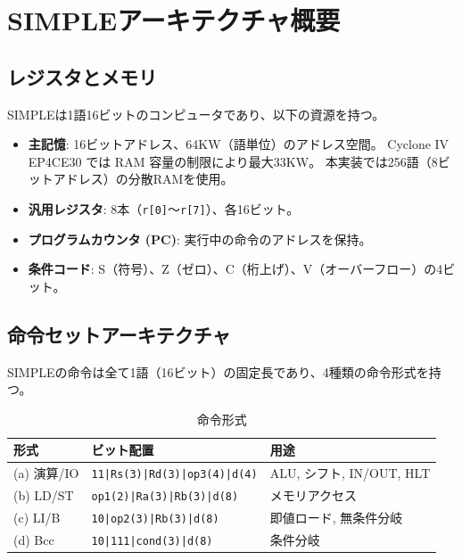 \documentclass[a4paper,11pt]{ltjsarticle}
\begin{document}
\section{SIMPLEアーキテクチャ概要}

\subsection{レジスタとメモリ}

SIMPLEは1語16ビットのコンピュータであり、以下の資源を持つ。

\begin{itemize}
\item \textbf{主記憶}: 16ビットアドレス、64KW（語単位）のアドレス空間。
  Cyclone IV EP4CE30 では RAM 容量の制限により最大33KW。
  本実装では256語（8ビットアドレス）の分散RAMを使用。
\item \textbf{汎用レジスタ}: 8本（\texttt{r[0]}〜\texttt{r[7]}）、各16ビット。
\item \textbf{プログラムカウンタ (PC)}: 実行中の命令のアドレスを保持。
\item \textbf{条件コード}: S（符号）、Z（ゼロ）、C（桁上げ）、V（オーバーフロー）の4ビット。
\end{itemize}

\subsection{命令セットアーキテクチャ}

SIMPLEの命令は全て1語（16ビット）の固定長であり、4種類の命令形式を持つ。

\begin{table}[h]
\centering
\caption{命令形式}
\label{tab:inst_format}
\begin{tabular}{lll}
\toprule
形式 & ビット配置 & 用途 \\
\midrule
(a) 演算/IO & \texttt{11|Rs(3)|Rd(3)|op3(4)|d(4)} & ALU, シフト, IN/OUT, HLT \\
(b) LD/ST   & \texttt{op1(2)|Ra(3)|Rb(3)|d(8)}     & メモリアクセス \\
(c) LI/B    & \texttt{10|op2(3)|Rb(3)|d(8)}         & 即値ロード, 無条件分岐 \\
(d) Bcc     & \texttt{10|111|cond(3)|d(8)}           & 条件分岐 \\
\bottomrule
\end{tabular}
\end{table}
\end{document}
